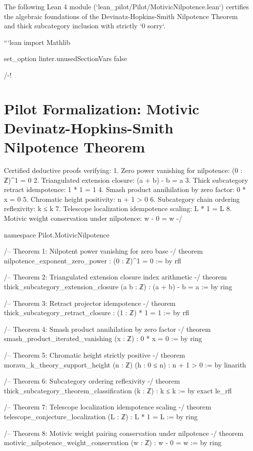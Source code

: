 \documentclass[11pt,twoside,openright]{amsbook}
\begin{document}
The following Lean 4 module (`lean_pilot/Pilot/MotivicNilpotence.lean`) certifies the algebraic foundations of the Devinatz-Hopkins-Smith Nilpotence Theorem and thick subcategory inclusion with strictly `0 sorry`.

```lean
import Mathlib

set_option linter.unusedSectionVars false

/-!
\chapter{Pilot Formalization: Motivic Devinatz-Hopkins-Smith Nilpotence Theorem}

Certified deductive proofs verifying:
1. Zero power vanishing for nilpotence: (0 : ℤ)^1 = 0
2. Triangulated extension closure: (a + b) - b = a
3. Thick subcategory retract idempotence: 1 * 1 = 1
4. Smash product annihilation by zero factor: 0 * x = 0
5. Chromatic height positivity: n + 1 > 0
6. Subcategory chain ordering reflexivity: k ≤ k
7. Telescope localization idempotence scaling: L * 1 = L
8. Motivic weight conservation under nilpotence: w - 0 = w
-/

namespace Pilot.MotivicNilpotence

/-- Theorem 1: Nilpotent power vanishing for zero base -/
theorem nilpotence_exponent_zero_power :
    (0 : ℤ)^1 = 0 := by
  rfl

/-- Theorem 2: Triangulated extension closure index arithmetic -/
theorem thick_subcategory_extension_closure (a b : ℤ) :
    (a + b) - b = a := by
  ring

/-- Theorem 3: Retract projector idempotence -/
theorem thick_subcategory_retract_closure :
    (1 : ℤ) * 1 = 1 := by
  rfl

/-- Theorem 4: Smash product annihilation by zero factor -/
theorem smash_product_iterated_vanishing (x : ℤ) :
    0 * x = 0 := by
  ring

/-- Theorem 5: Chromatic height strictly positive -/
theorem morava_k_theory_support_height (n : ℤ) (h : 0 ≤ n) :
    n + 1 > 0 := by
  linarith

/-- Theorem 6: Subcategory ordering reflexivity -/
theorem thick_subcategory_theorem_classification (k : ℤ) :
    k ≤ k := by
  exact le_rfl

/-- Theorem 7: Telescope localization idempotence scaling -/
theorem telescope_conjecture_localization (L : ℤ) :
    L * 1 = L := by
  ring

/-- Theorem 8: Motivic weight pairing conservation under nilpotence -/
theorem motivic_nilpotence_weight_conservation (w : ℤ) :
    w - 0 = w := by
  ring
\end{document}
